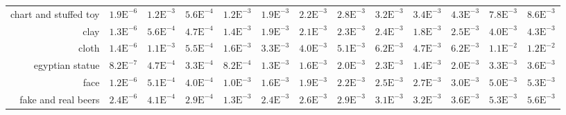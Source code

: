 \begin{landscape}
\begin{table}
\begin{tabularx}{\linewidth}{r | rr | rrrrrr | rrrr}
        chart and stuffed toy  & \footnotesize{$1.9\mathrm{E}^{-6}$}& \footnotesize{$1.2\mathrm{E}^{-3}$}& \footnotesize{$5.6\mathrm{E}^{-4}$}& \footnotesize{$1.2\mathrm{E}^{-3}$}& \footnotesize{$1.9\mathrm{E}^{-3}$}& \footnotesize{$2.2\mathrm{E}^{-3}$}& \footnotesize{$2.8\mathrm{E}^{-3}$}& \footnotesize{$3.2\mathrm{E}^{-3}$}& \footnotesize{$3.4\mathrm{E}^{-3}$}& \footnotesize{$4.3\mathrm{E}^{-3}$}& \footnotesize{$7.8\mathrm{E}^{-3}$}& \footnotesize{$8.6\mathrm{E}^{-3}$}\\
        clay  & \footnotesize{$1.3\mathrm{E}^{-6}$}& \footnotesize{$5.6\mathrm{E}^{-4}$}& \footnotesize{$4.7\mathrm{E}^{-4}$}& \footnotesize{$1.4\mathrm{E}^{-3}$}& \footnotesize{$1.9\mathrm{E}^{-3}$}& \footnotesize{$2.1\mathrm{E}^{-3}$}& \footnotesize{$2.3\mathrm{E}^{-3}$}& \footnotesize{$2.4\mathrm{E}^{-3}$}& \footnotesize{$1.8\mathrm{E}^{-3}$}& \footnotesize{$2.5\mathrm{E}^{-3}$}& \footnotesize{$4.0\mathrm{E}^{-3}$}& \footnotesize{$4.3\mathrm{E}^{-3}$}\\
        cloth  & \footnotesize{$1.4\mathrm{E}^{-6}$}& \footnotesize{$1.1\mathrm{E}^{-3}$}& \footnotesize{$5.5\mathrm{E}^{-4}$}& \footnotesize{$1.6\mathrm{E}^{-3}$}& \footnotesize{$3.3\mathrm{E}^{-3}$}& \footnotesize{$4.0\mathrm{E}^{-3}$}& \footnotesize{$5.1\mathrm{E}^{-3}$}& \footnotesize{$6.2\mathrm{E}^{-3}$}& \footnotesize{$4.7\mathrm{E}^{-3}$}& \footnotesize{$6.2\mathrm{E}^{-3}$}& \footnotesize{$1.1\mathrm{E}^{-2}$}& \footnotesize{$1.2\mathrm{E}^{-2}$}\\
        egyptian statue  & \footnotesize{$8.2\mathrm{E}^{-7}$}& \footnotesize{$4.7\mathrm{E}^{-4}$}& \footnotesize{$3.3\mathrm{E}^{-4}$}& \footnotesize{$8.2\mathrm{E}^{-4}$}& \footnotesize{$1.3\mathrm{E}^{-3}$}& \footnotesize{$1.6\mathrm{E}^{-3}$}& \footnotesize{$2.0\mathrm{E}^{-3}$}& \footnotesize{$2.3\mathrm{E}^{-3}$}& \footnotesize{$1.4\mathrm{E}^{-3}$}& \footnotesize{$2.0\mathrm{E}^{-3}$}& \footnotesize{$3.3\mathrm{E}^{-3}$}& \footnotesize{$3.6\mathrm{E}^{-3}$}\\
        face  & \footnotesize{$1.2\mathrm{E}^{-6}$}& \footnotesize{$5.1\mathrm{E}^{-4}$}& \footnotesize{$4.0\mathrm{E}^{-4}$}& \footnotesize{$1.0\mathrm{E}^{-3}$}& \footnotesize{$1.6\mathrm{E}^{-3}$}& \footnotesize{$1.9\mathrm{E}^{-3}$}& \footnotesize{$2.2\mathrm{E}^{-3}$}& \footnotesize{$2.5\mathrm{E}^{-3}$}& \footnotesize{$2.7\mathrm{E}^{-3}$}& \footnotesize{$3.0\mathrm{E}^{-3}$}& \footnotesize{$5.0\mathrm{E}^{-3}$}& \footnotesize{$5.3\mathrm{E}^{-3}$}\\
        fake and real beers  & \footnotesize{$2.4\mathrm{E}^{-6}$}& \footnotesize{$4.1\mathrm{E}^{-4}$}& \footnotesize{$2.9\mathrm{E}^{-4}$}& \footnotesize{$1.3\mathrm{E}^{-3}$}& \footnotesize{$2.4\mathrm{E}^{-3}$}& \footnotesize{$2.6\mathrm{E}^{-3}$}& \footnotesize{$2.9\mathrm{E}^{-3}$}& \footnotesize{$3.1\mathrm{E}^{-3}$}& \footnotesize{$3.2\mathrm{E}^{-3}$}& \footnotesize{$3.6\mathrm{E}^{-3}$}& \footnotesize{$5.3\mathrm{E}^{-3}$}& \footnotesize{$5.6\mathrm{E}^{-3}$}\\

\end{tabularx}
\end{table}
\end{landscape}
